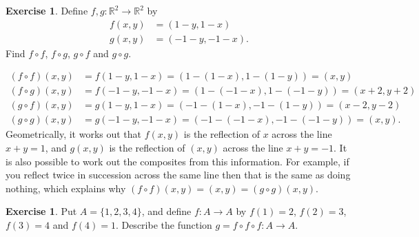 \documentclass[a4paper]{book}
\newcommand{\R}         {{\mathbb{R}}}
\newcommand{\xra}       {\xrightarrow}
\renewcommand{\:}{\colon}
\theoremstyle{definition}
\newtheorem{exercise}[theorem]{Exercise}
\renewenvironment{solution}{\SolutionInline}{\endSolutionInline}
\begin{document}
\begin{exercise}
 Define $f,g\:\R^2\xra{}\R^2$ by 
 \begin{align*}
  f(x,y) &= (1-y,1-x) \\
  g(x,y) &= (-1-y,-1-x).
 \end{align*}
 Find $f\circ f$, $f\circ g$, $g\circ f$ and $g\circ g$.
\end{exercise}
\begin{solution}
 \begin{align*}
  (f\circ f)(x,y) &= f(1-y,1-x) = (1-(1-x),1-(1-y)) = (x,y) \\
  (f\circ g)(x,y) &= f(-1-y,-1-x) = (1-(-1-x),1-(-1-y)) = (x+2,y+2) \\
  (g\circ f)(x,y) &= g(1-y,1-x) = (-1-(1-x),-1-(1-y)) = (x-2,y-2) \\
  (g\circ g)(x,y) &= g(-1-y,-1-x) = (-1-(-1-x),-1-(-1-y)) = (x,y).
 \end{align*}
 Geometrically, it works out that $f(x,y)$ is the reflection of $x$
 across the line $x+y=1$, and $g(x,y)$ is the reflection of $(x,y)$
 across the line $x+y=-1$.  It is also possible to work out the
 composites from this information.  For example, if you reflect twice
 in succession across the same line then that is the same as doing
 nothing, which explains why $(f\circ f)(x,y)=(x,y)=(g\circ g)(x,y)$.
\end{solution}
\begin{exercise}
 Put $A=\{1,2,3,4\}$, and define $f\:A\xra{}A$ by 
 $f(1)=2$, $f(2)=3$, $f(3)=4$ and $f(4)=1$.  Describe the function 
 $g=f\circ f\circ f\:A\xra{}A$.
\end{exercise}
\end{document}
